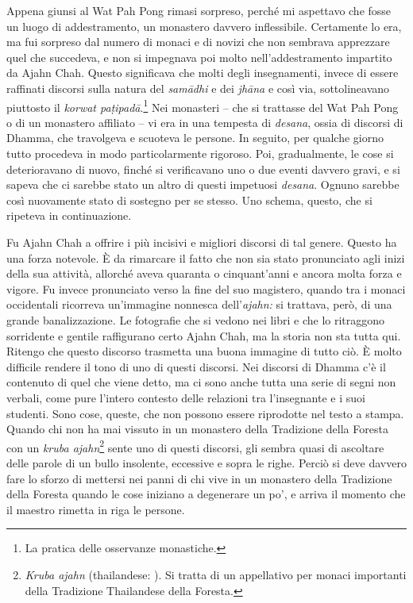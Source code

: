 Appena giunsi al Wat Pah Pong rimasi sorpreso, perché mi aspettavo che
fosse un luogo di addestramento, un monastero davvero inflessibile.
Certamente lo era, ma fui sorpreso dal numero di monaci e di novizi che
non sembrava apprezzare quel che succedeva, e non si impegnava poi molto
nell'addestramento impartito da Ajahn Chah. Questo significava che molti
degli insegnamenti, invece di essere raffinati discorsi sulla natura del
\emph{samādhi} e dei \emph{jhāna} e così via, sottolineavano piuttosto
il \emph{korwat paṭipadā}.\footnote{La pratica delle osservanze
  monastiche.} Nei monasteri -- che si trattasse del Wat Pah Pong o di
un monastero affiliato -- vi era in una tempesta di \emph{desana}, ossia
di discorsi di Dhamma, che travolgeva e scuoteva le persone. In seguito,
per qualche giorno tutto procedeva in modo particolarmente rigoroso.
Poi, gradualmente, le cose si deterioravano di nuovo, finché si
verificavano uno o due eventi davvero gravi, e si sapeva che ci sarebbe
stato un altro di questi impetuosi \emph{desana}. Ognuno sarebbe così
nuovamente stato di sostegno per se stesso. Uno schema, questo, che si
ripeteva in continuazione.

Fu Ajahn Chah a offrire i più incisivi e migliori discorsi di tal
genere. Questo ha una forza notevole. È da rimarcare il fatto che non
sia stato pronunciato agli inizi della sua attività, allorché aveva
quaranta o cinquant'anni e ancora molta forza e vigore. Fu invece
pronunciato verso la fine del suo magistero, quando tra i monaci
occidentali ricorreva un'immagine nonnesca dell'\emph{ajahn:} si
trattava, però, di una grande banalizzazione. Le fotografie che si
vedono nei libri e che lo ritraggono sorridente e gentile raffigurano
certo Ajahn Chah, ma la storia non sta tutta qui. Ritengo che questo
discorso trasmetta una buona immagine di tutto ciò. È molto difficile
rendere il tono di uno di questi discorsi. Nei discorsi di Dhamma c'è il
contenuto di quel che viene detto, ma ci sono anche tutta una serie di
segni non verbali, come pure l'intero contesto delle relazioni tra
l'insegnante e i suoi studenti. Sono cose, queste, che non possono
essere riprodotte nel testo a stampa. Quando chi non ha mai vissuto in
un monastero della Tradizione della Foresta con un \emph{kruba
ajahn}\footnote{\emph{Kruba ajahn} (thailandese: ). Si
  tratta di un appellativo per monaci importanti della Tradizione
  Thailandese della Foresta.} sente uno di questi discorsi, gli sembra
quasi di ascoltare delle parole di un bullo insolente, eccessive e sopra
le righe. Perciò si deve davvero fare lo sforzo di mettersi nei panni di
chi vive in un monastero della Tradizione della Foresta quando le cose
iniziano a degenerare un po', e arriva il momento che il maestro rimetta
in riga le persone.

